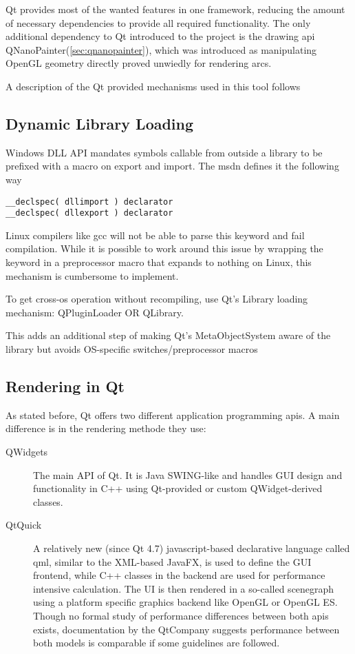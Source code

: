 Qt provides most of the wanted features in one framework, reducing the amount of necessary dependencies to provide all required functionality. The only additional dependency to Qt introduced to the project is the drawing \gls{api} QNanoPainter(\ref{sec:qnanopainter}), which was introduced as manipulating OpenGL geometry directly proved unwiedly for rendering arcs. 

A description of the Qt provided mechanisms used in this tool follows

\subsection{Dynamic Library Loading}
Windows DLL API mandates symbols callable from outside a library to be prefixed with a macro on export and import. The \gls{msdn} defines it the following way
\begin{lstlisting}
__declspec( dllimport ) declarator  
__declspec( dllexport ) declarator  
\end{lstlisting}

Linux compilers like gcc will not be able to parse this keyword and fail compilation. While it is possible to work around this issue by wrapping the keyword in a preprocessor macro that expands to nothing on Linux, this mechanism is cumbersome to implement.

To get cross-\gls{os} operation without recompiling, use Qt's Library loading mechanism: QPluginLoader OR QLibrary.

This adds an additional step of making Qt's MetaObjectSystem aware of the library but avoids OS-specific switches/preprocessor macros

\subsection{Rendering in Qt}
As stated before, Qt offers two different application programming \gls{api}s. A main difference is in the rendering methode they use:
\begin{description}
	\item [QWidgets] The main API of Qt. It is Java SWING-like and handles GUI design and functionality in C++ using Qt-provided or custom QWidget-derived classes.
	\item [QtQuick] A relatively new (since Qt 4.7) javascript-based declarative language called \gls{qml}, similar to the XML-based JavaFX, is used to define the GUI frontend, while C++ classes in the backend are used for performance intensive calculation. The UI is then rendered in a so-called scenegraph using a platform specific graphics backend like OpenGL or OpenGL ES. Though no formal study of performance differences between both \gls{api}s exists, documentation by the QtCompany suggests performance between both models is comparable if some guidelines are followed.
\end{description}

